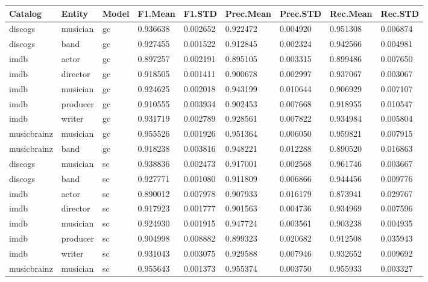 \documentclass[epsfig,a4paper,11pt,titlepage,twoside,openany]{book}
\begin{document}
\begin{longtable}{|l|l|l|l|l|l|l|l|l|}
\hline
Catalog     & Entity   & Model & F1.Mean  & F1.STD   & Prec.Mean & Prec.STD & Rec.Mean & Rec.STD  \\ \hline
discogs     & musician & gc    & 0.936638 & 0.002652 & 0.922472  & 0.004920 & 0.951308 & 0.006874 \\
discogs     & band     & gc    & 0.927455 & 0.001522 & 0.912845  & 0.002324 & 0.942566 & 0.004981 \\
imdb        & actor    & gc    & 0.897257 & 0.002191 & 0.895105  & 0.003315 & 0.899486 & 0.007650 \\
imdb        & director & gc    & 0.918505 & 0.001411 & 0.900678  & 0.002997 & 0.937067 & 0.003067 \\
imdb        & musician & gc    & 0.924625 & 0.002018 & 0.943199  & 0.010644 & 0.906929 & 0.007107 \\
imdb        & producer & gc    & 0.910555 & 0.003934 & 0.902453  & 0.007668 & 0.918955 & 0.010547 \\
imdb        & writer   & gc    & 0.931719 & 0.002789 & 0.928561  & 0.007822 & 0.934984 & 0.005804 \\
musicbrainz & musician & gc    & 0.955526 & 0.001926 & 0.951364  & 0.006050 & 0.959821 & 0.007915 \\ 
musicbrainz & band     & gc    & 0.918238 & 0.003816 & 0.948221  & 0.012288 & 0.890520 & 0.016863 \\ \hline
discogs     & musician & sc    & 0.938836 & 0.002473 & 0.917001  & 0.002568 & 0.961746 & 0.003667 \\
discogs     & band     & sc    & 0.927771 & 0.001080 & 0.911809  & 0.006866 & 0.944456 & 0.009776 \\
imdb        & actor    & sc    & 0.890012 & 0.007978 & 0.907933  & 0.016179 & 0.873941 & 0.029767 \\
imdb        & director & sc    & 0.917923 & 0.001777 & 0.901563  & 0.004736 & 0.934969 & 0.007596 \\
imdb        & musician & sc    & 0.924930 & 0.001915 & 0.947724  & 0.003561 & 0.903238 & 0.004935 \\
imdb        & producer & sc    & 0.904998 & 0.008882 & 0.899323  & 0.020682 & 0.912508 & 0.035943 \\
imdb        & writer   & sc    & 0.931043 & 0.003075 & 0.929588  & 0.007946 & 0.932652 & 0.009692 \\
musicbrainz & musician & sc    & 0.955643 & 0.001373 & 0.955374  & 0.003750 & 0.955933 & 0.003327 \\

\end{longtable}
\end{document}
